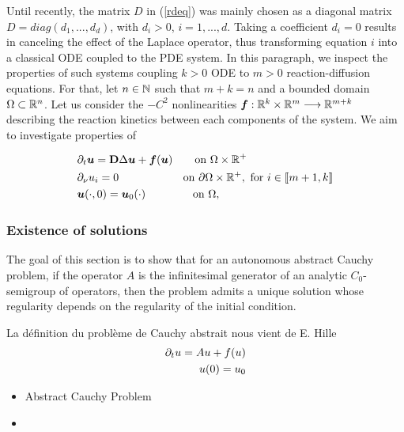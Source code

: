 Until recently, the matrix $D$ in (\ref{rdeq}) was mainly chosen as a diagonal matrix $D = diag(d_1, ..., d_d)$, with $d_i > 0$, $i = 1, ..., d$. Taking a coefficient $d_i = 0$ results in canceling the effect of the Laplace operator, thus transforming equation $i$ into a classical ODE coupled to the PDE system. In this paragraph, we inspect the properties of such systems coupling $k >0$ ODE to $m > 0$ reaction-diffusion equations. For that, let $n \in \mathbb{N}$ such that $m+k = n$ and a bounded domain $\Omega \subset \mathbb{R}^{n}$. Let us consider the $\mathcal-C^2$ nonlinearities $\bm f : \mathbb{R}^k \times \mathbb{R}^m \longrightarrow \mathbb{R}^{m+k}$ describing the reaction kinetics between each components of the system. We aim to investigate properties of
 
\begin{align}
	& \partial_t\bm{u}  = \bm{\mathrm D} \Delta \bm{u} + \bm{f}(\bm{u}) \quad\quad \text{on } \Omega \times \mathbb R^{+} \notag \\  &\partial_\nu u_i = 0 \qquad\qquad\qquad\! \text{on } \partial\Omega \times \mathbb R^{+}, \text{ for } i \in [\![ m+1, k ]\!]\\
	&\bm{u}(\cdot, 0) = \bm{u}_0(\cdot) \qquad\qquad\; \text{on } \Omega, \notag
\end{align}


\subsubsection{Existence of solutions}

The goal of this section is to show that for an autonomous abstract Cauchy problem, if the operator $A$ is the infinitesimal generator of an analytic $C_0$-semigroup of operators, then the problem admits a unique solution whose regularity depends on the regularity of the initial condition.

\begin{definition} La définition du problème de Cauchy abstrait nous vient de E. Hille 
	\begin{align}
		\partial_t u = Au + f(u) \notag \\
		u(0) = u_0 \notag
	\end{align}
\end{definition}

\begin{itemize}
	\item Abstract Cauchy Problem
	\item 
\end{itemize}


